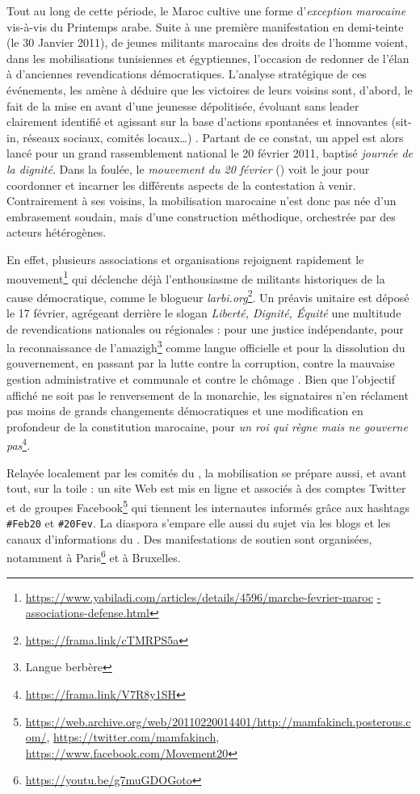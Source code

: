\documentclass[symmetric,justified,marginals=raggedouter]{tufte-book}
\begin{document}
\newpage

\noindent Tout au long de cette période, le Maroc cultive une forme d'\textit{exception marocaine} vis-à-vis du Printemps arabe. Suite à une première manifestation en demi-teinte (le 30 Janvier 2011), de jeunes militants marocains des droits de l'homme voient, dans les mobilisations tunisiennes et égyptiennes, l'occasion de redonner de l'élan à d'anciennes revendications démocratiques. L'analyse stratégique de ces événements, les amène à déduire que les victoires de leurs voisins sont, d'abord, le fait de la mise en avant d'une jeunesse dépolitisée, évoluant sans leader clairement identifié et agissant sur la base d'actions spontanées et innovantes (sit-in, réseaux sociaux, comités locaux\ldots{}) \citep{bennani-chraibi_dynamique_2012}. Partant de ce constat, un appel est alors lancé pour un grand rassemblement national le 20 février 2011, baptisé \textit{journée de la dignité}. Dans la foulée, le \textit{mouvement du 20 février} () voit le jour pour coordonner et incarner les différents aspects de la contestation à venir. Contrairement à ses voisins, la mobilisation marocaine n'est donc pas née d'un embrasement soudain, mais d'une construction méthodique, orchestrée par des acteurs hétérogènes.

En effet, plusieurs associations et organisations rejoignent rapidement le mouvement\footnote{\RaggedOuter \url{https://www.yabiladi.com/articles/details/4596/marche-fevrier-maroc} \url{-associations-defense.html}} qui déclenche déjà l'enthousiasme de militants historiques de la cause démocratique, comme le blogueur \textit{larbi.org}\footnote{\RaggedOuter \url{https://frama.link/cTMRPS5a}}. Un préavis unitaire est déposé le 17 février, agrégeant derrière le slogan \og\textit{Liberté, Dignité, Équité}\fg{} une multitude de revendications nationales ou régionales : pour une justice indépendante, pour la reconnaissance de l'amazigh\footnote{\RaggedOuter Langue berbère } comme langue officielle et pour la dissolution du gouvernement, en passant par la lutte contre la corruption, contre la mauvaise gestion administrative et communale et contre le chômage \citep{bennafla_maroc_2011}. Bien que l'objectif affiché ne soit pas le renversement de la monarchie, les signataires n'en réclament pas moins de grands changements démocratiques et une modification en profondeur de la constitution marocaine, pour \og\textit{un roi qui règne mais ne gouverne pas}\fg{}\footnote{\RaggedOuter \url{https://frama.link/V7R8y1SH}}.

Relayée localement par les comités du , la mobilisation se prépare aussi, et avant tout, sur la toile : un site Web est mis en ligne et associés à des comptes Twitter et de groupes Facebook\footnote{\RaggedOuter \url{https://web.archive.org/web/20110220014401/http://mamfakinch.posterous.com/}, \url{https://twitter.com/mamfakinch}, \url{https://www.facebook.com/Movement20}} qui tiennent les internautes informés grâce aux hashtags \texttt{\#Feb20} et \texttt{\#20Fev}. La diaspora s'empare elle aussi du sujet via les blogs et les canaux d'informations du . Des manifestations de soutien sont organisées, notamment à Paris\footnote{\RaggedOuter \url{https://youtu.be/g7muGDOGoto}} et à Bruxelles. 
\end{document}
